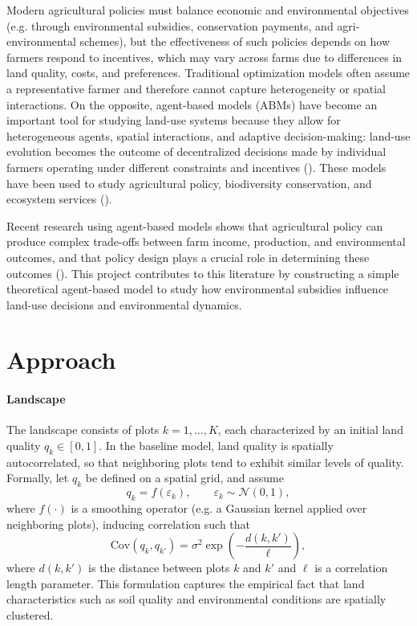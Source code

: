 \documentclass{article}
\begin{document}
Modern agricultural policies must balance economic and environmental objectives (e.g. through environmental subsidies, conservation payments, and agri-environmental schemes), but the effectiveness of such policies depends on how farmers respond to incentives, which may vary across farms due to differences in land quality, costs, and preferences. Traditional optimization models often assume a representative farmer and therefore cannot capture heterogeneity or spatial interactions. On the opposite, agent-based models (ABMs) have become an important tool for studying land-use systems because they allow for heterogeneous agents, spatial interactions, and adaptive decision-making: land-use evolution becomes the outcome of decentralized decisions made by individual farmers operating under different constraints and incentives (\cite{matthews2007abm, dai2020landsystem}). These models have been used to study agricultural policy, biodiversity conservation, and ecosystem services (\cite{brady2012abm}).

Recent research using agent-based models shows that agricultural policy can produce complex trade-offs between farm income, production, and environmental outcomes, and that policy design plays a crucial role in determining these outcomes (\cite{coronese2023agrilove, bayram2024luxembourg, baldi2025cap}). This project contributes to this literature by constructing a simple theoretical agent-based model to study how environmental subsidies influence land-use decisions and environmental dynamics.

\section*{Approach}

\paragraph{Landscape}

The landscape consists of plots $k = 1, \dots, K$, each characterized by an initial land quality $q_k \in [0,1]$. In the baseline model, land quality is spatially autocorrelated, so that neighboring plots tend to exhibit similar levels of quality. Formally, let $q_k$ be defined on a spatial grid, and assume
\[
q_k = f(\varepsilon_k), \qquad \varepsilon_k \sim \mathcal{N}(0,1),
\]
where $f(\cdot)$ is a smoothing operator (e.g. a Gaussian kernel applied over neighboring plots), inducing correlation such that
\[
\text{Cov}(q_k, q_{k'}) = \sigma^2 \exp\left(-\frac{d(k,k')}{\ell}\right),
\]
where $d(k,k')$ is the distance between plots $k$ and $k'$ and $\ell$ is a correlation length parameter. This formulation captures the empirical fact that land characteristics such as soil quality and environmental conditions are spatially clustered.
\end{document}
